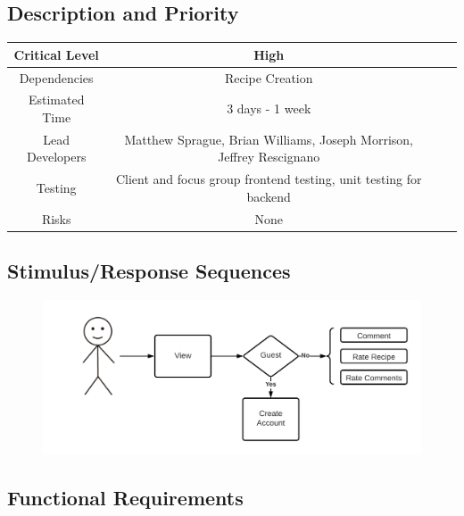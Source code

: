 \documentclass{scrreprt}
\begin{document}
\subsection{Description and Priority}
\begin{center}
    \begin{tabular}{| c | c | c | c |}
        \hline
        Critical Level  & High                                                                 \\
        \hline
        Dependencies    & Recipe Creation                                                      \\
        \hline
        Estimated Time  & 3 days - 1 week                                                      \\
        \hline
        Lead Developers & Matthew Sprague, Brian Williams, Joseph Morrison, Jeffrey Rescignano \\
        \hline
        Testing         & Client and focus group frontend testing, unit testing for backend    \\
        \hline
        Risks           & None                                                                 \\
        \hline
    \end{tabular}
\end{center}

\subsection{Stimulus/Response Sequences}

\begin{figure}[H]\centering
    \includegraphics[width=\columnwidth]{FlowCharts/Recipe-Pages.png}
\end{figure}

\subsection{Functional Requirements}
\end{document}
